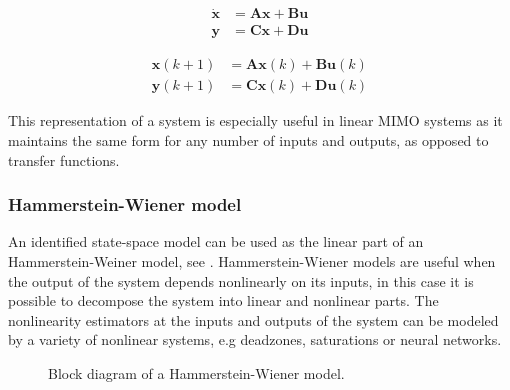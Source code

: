 \begin{equation}\label{eq:ssc}
\begin{split}
\dot{\mathbf{x}} &= \mathbf{A}\mathbf{x} + \mathbf{B}\mathbf{u} \\
\mathbf{y} &= \mathbf{C}\mathbf{x} + \mathbf{D}\mathbf{u}
\end{split}
\end{equation}

\begin{equation}\label{eq:ssd}
\begin{split}
\mathbf{x}(k+1) &= \mathbf{A}\mathbf{x}(k) + \mathbf{B}\mathbf{u}(k)\\
\mathbf{y}(k+1) &= \mathbf{C}\mathbf{x}(k) + \mathbf{D}\mathbf{u}(k)
\end{split}
\end{equation}




This representation of a system is especially useful in linear MIMO systems as it maintains the same form for any number of inputs and outputs, as opposed to transfer functions.

\subsubsection{Hammerstein-Wiener model}\label{hammerWeinmodeid}
An identified state-space model can be used as the linear part of an Hammerstein-Weiner model, see .
Hammerstein-Wiener models are useful when the output of the system depends nonlinearly on its inputs, in this case it is possible to decompose the system into linear and nonlinear parts. 
The nonlinearity estimators at the inputs and outputs of the system can be modeled by a variety of nonlinear systems, e.g deadzones, saturations or neural networks.

\begin{figure}[H]
\caption{Block diagram of a Hammerstein-Wiener model.}
\label{weiner}
\end{figure}

